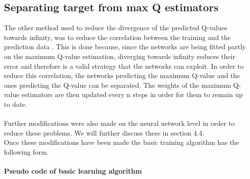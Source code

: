 \subsection{Separating target from max Q estimators}
The other method used to reduce the divergence of the predicted Q-values towards infinity, was to reduce the correlation between the training and the prediction data \cite{Mnih2015}. This is done because, since the networks are being fitted partly on the maximum Q-value estimation, diverging towards infinity reduces their error and therefore is a valid strategy that the networks can exploit. In order to reduce this correlation, the networks predicting the maximum Q-value and the ones predicting the Q-value can be separated. The weights of the maximum Q-value estimators are then updated every n steps in order for them to remain up to date.\\
\mbox{}\\
Further modifications were also made on the neural network level in order to reduce these problems. We will further discuss these in section 4.4.\\
Once these modifications have been made the basic training algorithm has the following form.
\paragraph{Pseudo code of basic learning algorithm}

